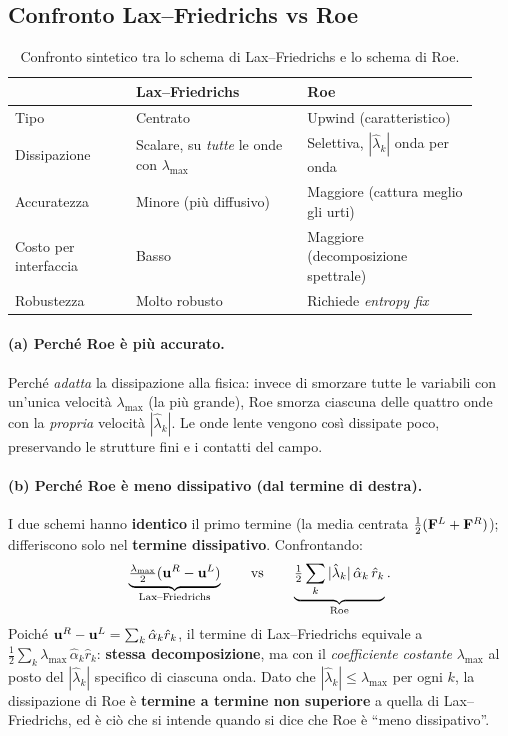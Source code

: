 \subsection{Confronto Lax--Friedrichs vs Roe}

\begin{table}[H]
\centering
\caption{Confronto sintetico tra lo schema di Lax--Friedrichs e lo schema di Roe.}
\begin{tabular}{p{0.24\linewidth} p{0.34\linewidth} p{0.34\linewidth}}
\toprule
 & \textbf{Lax--Friedrichs} & \textbf{Roe} \\
\midrule
Tipo & Centrato & Upwind (caratteristico) \\
Dissipazione & Scalare, su \emph{tutte} le onde con $\lambda_{\max}$ & Selettiva, $|\hat\lambda_k|$ onda per onda \\
Accuratezza & Minore (più diffusivo) & Maggiore (cattura meglio gli urti) \\
Costo per interfaccia & Basso & Maggiore (decomposizione spettrale) \\
Robustezza & Molto robusto & Richiede \emph{entropy fix} \\
\bottomrule
\end{tabular}
\end{table}

\paragraph{(a) Perché Roe è più accurato.}
Perché \emph{adatta} la dissipazione alla fisica: invece di smorzare tutte le variabili
con un'unica velocità $\lambda_{\max}$ (la più grande), Roe smorza ciascuna delle
quattro onde con la \emph{propria} velocità $|\hat\lambda_k|$. Le onde lente vengono
così dissipate poco, preservando le strutture fini e i contatti del campo.

\paragraph{(b) Perché Roe è meno dissipativo (dal termine di destra).}
I due schemi hanno \textbf{identico} il primo termine (la media centrata
$\tfrac12(\mathbf{F}^L+\mathbf{F}^R)$); differiscono solo nel \textbf{termine dissipativo}.
Confrontando:
\[
  \underbrace{\tfrac{\lambda_{\max}}{2}(\mathbf{u}^R-\mathbf{u}^L)}_{\text{Lax--Friedrichs}}
  \qquad\text{vs}\qquad
  \underbrace{\tfrac12\sum_k |\hat\lambda_k|\,\hat\alpha_k\,\hat r_k}_{\text{Roe}} .
\]
Poiché $\mathbf{u}^R-\mathbf{u}^L = \sum_k \hat\alpha_k\hat r_k$, il termine di Lax--Friedrichs
equivale a $\tfrac12\sum_k \lambda_{\max}\,\hat\alpha_k\hat r_k$: \textbf{stessa
decomposizione}, ma con il \emph{coefficiente costante} $\lambda_{\max}$ al posto del
$|\hat\lambda_k|$ specifico di ciascuna onda. Dato che $|\hat\lambda_k|\le\lambda_{\max}$
per ogni $k$, la dissipazione di Roe è \textbf{termine a termine non superiore} a quella
di Lax--Friedrichs, ed è ciò che si intende quando si dice che Roe è ``meno
dissipativo''.

